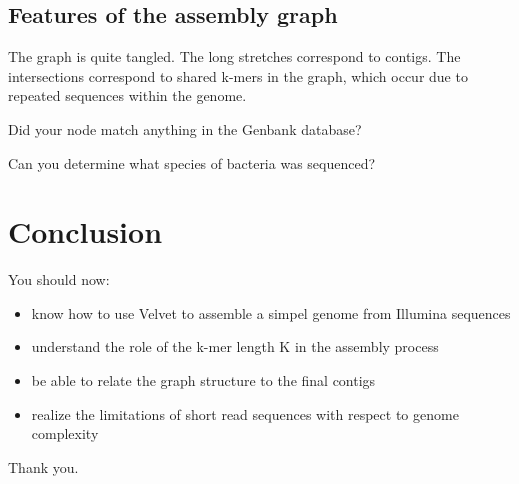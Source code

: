 \subsection{Features of the assembly graph}
The graph is quite tangled. The long stretches correspond to contigs. The intersections correspond to shared k-mers in the graph, which occur due to repeated sequences within the genome.

\begin{questions}
Did your node match anything in the Genbank database?
\begin{answer}
\end{answer}
Can you determine what species of bacteria was sequenced?
\begin{answer}
\end{answer}
\end{questions}

\section{Conclusion}
You should now:
\begin{itemize}
\item know how to use Velvet to assemble a simpel genome from Illumina sequences
\item understand the role of the k-mer length K in the assembly process
\item be able to relate the graph structure to the final contigs
\item realize the limitations of short read sequences with respect to genome complexity
\end{itemize}
Thank you.
